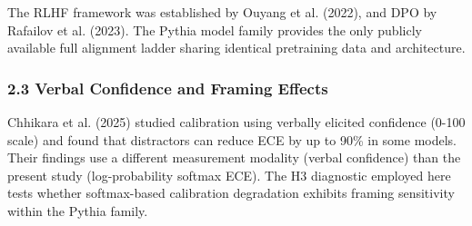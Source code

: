 The RLHF framework was established by Ouyang et al. (2022), and DPO by Rafailov et al. (2023). The Pythia model family \citep{biderman2023pythia} provides the only publicly available full alignment ladder sharing identical pretraining data and architecture.

\subsubsection{2.3 Verbal Confidence and Framing Effects}

Chhikara et al. (2025) studied calibration using verbally elicited confidence (0-100 scale) and found that distractors can reduce ECE by up to 90\% in some models. Their findings use a different measurement modality (verbal confidence) than the present study (log-probability softmax ECE). The H3 diagnostic employed here tests whether softmax-based calibration degradation exhibits framing sensitivity within the Pythia family.

